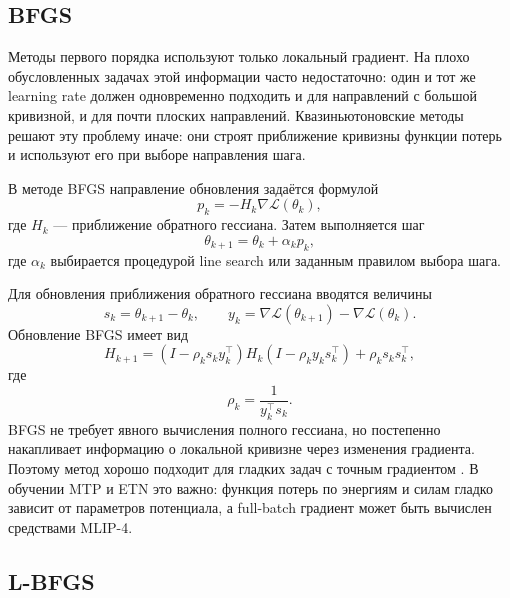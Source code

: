 \subsection{BFGS}

Методы первого порядка используют только локальный градиент. На плохо обусловленных задачах этой информации часто недостаточно: один и тот же learning rate должен одновременно подходить и для направлений с большой кривизной, и для почти плоских направлений. Квазиньютоновские методы решают эту проблему иначе: они строят приближение кривизны функции потерь и используют его при выборе направления шага.

В методе BFGS направление обновления задаётся формулой
\begin{equation}
    p_k
    =
    -
    H_k
    \nabla \mathcal L(\theta_k),
\end{equation}
где \(H_k\) --- приближение обратного гессиана. Затем выполняется шаг
\begin{equation}
    \theta_{k+1}
    =
    \theta_k
    +
    \alpha_k p_k,
\end{equation}
где \(\alpha_k\) выбирается процедурой line search или заданным правилом выбора шага.

Для обновления приближения обратного гессиана вводятся величины
\begin{equation}
    s_k
    =
    \theta_{k+1}-\theta_k,
    \qquad
    y_k
    =
    \nabla \mathcal L(\theta_{k+1})
    -
    \nabla \mathcal L(\theta_k).
\end{equation}
Обновление BFGS имеет вид
\begin{equation}
    H_{k+1}
    =
    \left(
        I
        -
        \rho_k s_k y_k^\top
    \right)
    H_k
    \left(
        I
        -
        \rho_k y_k s_k^\top
    \right)
    +
    \rho_k s_k s_k^\top,
\end{equation}
где
\begin{equation}
    \rho_k
    =
    \frac{1}{y_k^\top s_k}.
\end{equation}
BFGS не требует явного вычисления полного гессиана, но постепенно накапливает информацию о локальной кривизне через изменения градиента. Поэтому метод хорошо подходит для гладких задач с точным градиентом \cite{nocedal2006numerical}. В обучении MTP и ETN это важно: функция потерь по энергиям и силам гладко зависит от параметров потенциала, а full-batch градиент может быть вычислен средствами MLIP-4.

\subsection{L-BFGS}

